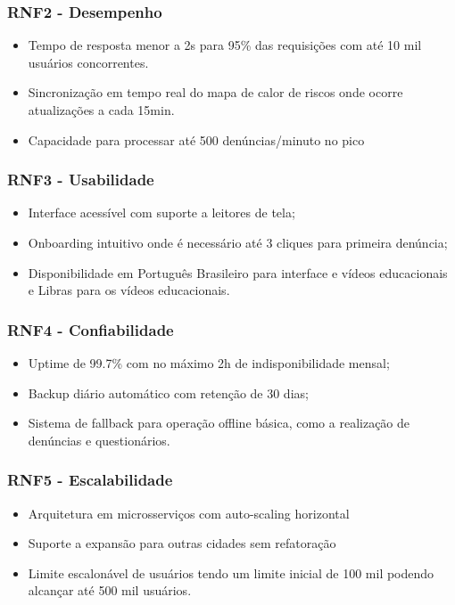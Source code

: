 \documentclass[a5paper, 12pt]{article}
\begin{document}
        \subsubsection{RNF2 - Desempenho}
            \begin{itemize}
                \item Tempo de resposta menor a 2s para 95\% das requisições com até 10 mil usuários concorrentes.
                \item Sincronização em tempo real do mapa de calor de riscos onde ocorre atualizações a cada 15min.
                \item Capacidade para processar até 500 denúncias/minuto no pico
            \end{itemize}
        
        \subsubsection{RNF3 - Usabilidade}
            \begin{itemize}
                \item Interface acessível com suporte a leitores de tela;
                \item Onboarding intuitivo onde é necessário até 3 cliques para primeira denúncia;
                \item Disponibilidade em Português Brasileiro para interface e vídeos educacionais e Libras para os vídeos educacionais.
            \end{itemize}
            
        \subsubsection{RNF4 - Confiabilidade}
            \begin{itemize}
                \item Uptime de 99.7\% com no máximo 2h de indisponibilidade mensal;
                \item Backup diário automático com retenção de 30 dias;
                \item Sistema de fallback para operação offline básica, como a realização de denúncias e questionários.
            \end{itemize}
            
        \subsubsection{RNF5 - Escalabilidade}
            \begin{itemize}
                \item Arquitetura em microsserviços com auto-scaling horizontal
                \item Suporte a expansão para outras cidades sem refatoração
                \item Limite escalonável de usuários tendo um limite inicial de 100 mil podendo alcançar até 500 mil usuários.
            \end{itemize}
        
\end{document}
